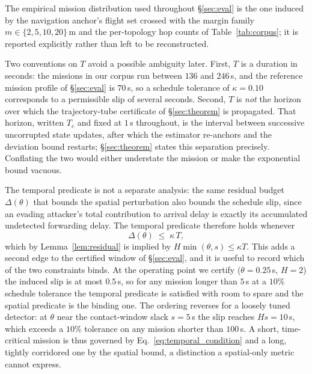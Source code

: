 The empirical mission distribution used throughout \S\ref{sec:eval} is the one
induced by the navigation anchor's flight set crossed with the margin family
$m\in\{2,5,10,20\}$\,m and the per-topology hop counts of
Table~\ref{tab:corpus}; it is reported explicitly rather than left to be
reconstructed.

Two conventions on $T$ avoid a possible ambiguity later. First, $T$ is a
duration in seconds: the missions in our corpus run between $136$ and $246$\,s,
and the reference mission profile of \S\ref{sec:eval} is $70$\,s, so a schedule
tolerance of $\kappa=0.10$ corresponds to a permissible slip of several seconds.
Second, $T$ is \emph{not} the horizon over which the trajectory-tube certificate
of \S\ref{sec:theorem} is propagated. That horizon, written $T_c$ and fixed at
$1$\,s throughout, is the interval between successive uncorrupted state updates,
after which the estimator re-anchors and the deviation bound restarts;
\S\ref{sec:theorem} states this separation precisely. Conflating the two would
either understate the mission or make the exponential bound vacuous.

The temporal predicate is not a separate analysis: the same residual budget
$\Delta(\theta)$ that bounds the spatial perturbation also bounds the schedule
slip, since an evading attacker's total contribution to arrival delay is exactly
its accumulated undetected forwarding delay. The temporal predicate therefore
holds whenever
\begin{equation}
\label{eq:temporal_condition}
\Delta(\theta)\;\le\;\kappa\,T ,
\end{equation}
which by Lemma~\ref{lem:residual} is implied by $H\min(\theta,s)\le\kappa T$.
This adds a second edge to the certified window of \S\ref{sec:eval}, and it is useful to record which of the two
constraints binds. At the operating point we certify
($\theta=0.25$\,s, $H=2$) the induced slip is at most $0.5$\,s, so for any
mission longer than $5$\,s at a $10\%$ schedule tolerance the temporal predicate
is satisfied with room to spare and the spatial predicate is the binding one.
The ordering reverses for a loosely tuned detector: at $\theta$ near the
contact-window slack $s=5$\,s the slip reaches $H s = 10$\,s, which exceeds a
$10\%$ tolerance on any mission shorter than $100$\,s. A short, time-critical
mission is thus governed by Eq.~\eqref{eq:temporal_condition} and a long,
tightly corridored one by the spatial bound, a distinction a spatial-only
metric cannot express.

